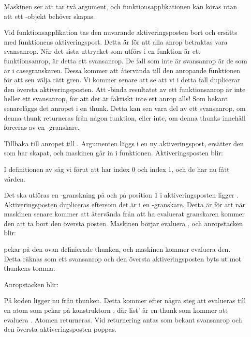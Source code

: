 \documentclass[../Core]{subfiles}
\begin{document}
Maskinen ser att  tar två argument, och funktionsapplikationen 
kan köras utan att ett -objekt behöver skapas.

Vid funktionsapplikation tas den nuvarande aktiveringsposten bort och ersätts 
med funktionens aktiveringspost. Detta är för att alla anrop betraktas vara
svansanrop.
När det sista uttrycket som utförs i en funktion är ett funktionsanrop, är
detta ett svansanrop. De fall som inte är svansanrop
är de som är i casegranskaren. Dessa kommer att återvända till den anropande
funktionen för att sen välja rätt gren. Vi kommer senare att se att vi i detta
fall duplicerar den översta aktiveringsposten. 
Att -binda resultatet av ett
funktionsanrop är inte heller ett svansanrop, för att det är faktiskt inte ett
anrop alls! Som bekant senareläggs det anropet i en thunk. Detta kan sen vara
del av ett svansanrop, om denna thunk returneras från någon funktion, eller inte,
om denna thunks innehåll forceras av en -granskare.

Tillbaka till anropet till . 
Argumenten läggs i en ny aktiveringspost, ersätter den som  har skapat,
och maskinen går in i funktionen. 
Aktiveringsposten blir:
\begin{codeEx}
\end{codeEx}
I definitionen av  såg vi förut att  har index 0 och
 index 1, och de har nu fått värden.

Det ska utföras en -granskning på  och på position 1 i
aktiveringsposten ligger . Aktiveringsposten dupliceras eftersom
det är i en -granskare. Detta är för att när maskinen senare kommer
att återvända från att ha evaluerat granskaren kommer den att ta bort den 
översta posten. Maskinen börjar evaluera , och anropstacken blir:
\begin{codeEx}
\end{codeEx}

 pekar på den ovan definierade thunken, och maskinen kommer evaluera den.
Detta räknas som ett svansanrop och den översta aktiveringsposten byts
ut mot thunkens tomma.

Anropstacken blir:
\begin{codeEx}
\end{codeEx}

På koden ligger nu  från thunken. 
Detta kommer efter några steg att evalueras till en atom 
som pekar på 
konstruktorn , där list' är
en thunk som kommer att evaluera . 
Atomen
returneras. Vid returnering antas som bekant svansanrop och 
den översta aktiveringsposten poppas.
\end{document}
